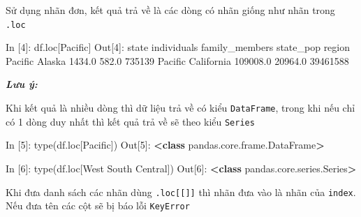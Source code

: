 \documentclass[
]{book}
\makeatletter
\newenvironment{Shaded}{\begin{snugshade}}{\end{snugshade}}
\newcommand{\BuiltInTok}[1]{#1}
\newcommand{\DecValTok}[1]{\textcolor[rgb]{0.00,0.00,0.81}{#1}}
\newcommand{\FloatTok}[1]{\textcolor[rgb]{0.00,0.00,0.81}{#1}}
\newcommand{\KeywordTok}[1]{\textcolor[rgb]{0.13,0.29,0.53}{\textbf{#1}}}
\newcommand{\NormalTok}[1]{#1}
\newcommand{\OperatorTok}[1]{\textcolor[rgb]{0.81,0.36,0.00}{\textbf{#1}}}
\newcommand{\StringTok}[1]{\textcolor[rgb]{0.31,0.60,0.02}{#1}}
\newenvironment{kframe}{%
\medskip{}
\setlength{\fboxsep}{.8em}
 \def\at@end@of@kframe{}%
 \ifinner\ifhmode%
  \def\at@end@of@kframe{\end{minipage}}%
  \begin{minipage}{\columnwidth}%
 \fi\fi%
 \def\FrameCommand##1{\hskip\@totalleftmargin \hskip-\fboxsep
 \colorbox{shadecolor}{##1}\hskip-\fboxsep
     \hskip-\linewidth \hskip-\@totalleftmargin \hskip\columnwidth}%
 \MakeFramed {\advance\hsize-\width
   \@totalleftmargin\z@ \linewidth\hsize
   \@setminipage}}%
 {\par\unskip\endMakeFramed%
 \at@end@of@kframe}
\newenvironment{rmdblock}[1]
  {
  \begin{itemize}
  \renewcommand{\labelitemi}{
    \raisebox{-.7\height}[0pt][0pt]{
      {\setkeys{Gin}{width=3em,keepaspectratio}\texttt{[image: images/\#1]}}
    }
  }
  \setlength{\fboxsep}{1em}
  \begin{kframe}
  \item
  }
  {
  \end{kframe}
  \end{itemize}
  }
\newenvironment{rmdnote}
  {\begin{rmdblock}{note}}
  {\end{rmdblock}}
\makeatother
\begin{document}
Sử dụng nhãn đơn, kết quả trả về là các dòng có nhãn giống như nhãn trong \texttt{.loc}

\begin{Shaded}
\begin{Highlighting}[]
\NormalTok{In [}\DecValTok{4}\NormalTok{]: df.loc[}\StringTok{\textquotesingle{}Pacific\textquotesingle{}}\NormalTok{]}
\NormalTok{Out[}\DecValTok{4}\NormalTok{]:          }
\NormalTok{              state  individuals  family\_members  state\_pop}
\NormalTok{region                                                     }
\NormalTok{Pacific      Alaska       }\FloatTok{1434.0}           \FloatTok{582.0}     \DecValTok{735139}
\NormalTok{Pacific  California     }\FloatTok{109008.0}         \FloatTok{20964.0}   \DecValTok{39461588}
\end{Highlighting}
\end{Shaded}

\begin{rmdnote}
\textbf{\emph{Lưu ý:}}

Khi kết quả là nhiều dòng thì dữ liệu trả về có kiểu \texttt{DataFrame}, trong khi nếu chỉ có 1 dòng duy nhất thì kết quả trả về sẽ theo kiểu \texttt{Series}
\end{rmdnote}

\begin{Shaded}
\begin{Highlighting}[]
\NormalTok{In [}\DecValTok{5}\NormalTok{]: }\BuiltInTok{type}\NormalTok{(df.loc[}\StringTok{\textquotesingle{}Pacific\textquotesingle{}}\NormalTok{])}
\NormalTok{Out[}\DecValTok{5}\NormalTok{]: }
\OperatorTok{\textless{}}\KeywordTok{class} \StringTok{\textquotesingle{}pandas.core.frame.DataFrame\textquotesingle{}}\OperatorTok{\textgreater{}}

\NormalTok{In [}\DecValTok{6}\NormalTok{]: }\BuiltInTok{type}\NormalTok{(df.loc[}\StringTok{\textquotesingle{}West South Central\textquotesingle{}}\NormalTok{])}
\NormalTok{Out[}\DecValTok{6}\NormalTok{]: }
\OperatorTok{\textless{}}\KeywordTok{class} \StringTok{\textquotesingle{}pandas.core.series.Series\textquotesingle{}}\OperatorTok{\textgreater{}}
\end{Highlighting}
\end{Shaded}

Khi đưa danh sách các nhãn dùng \texttt{.loc{[}{[}{]}{]}} thì nhãn đưa vào là nhãn của \texttt{index}. Nếu đưa tên các cột sẽ bị báo lỗi \texttt{KeyError}
\end{document}
